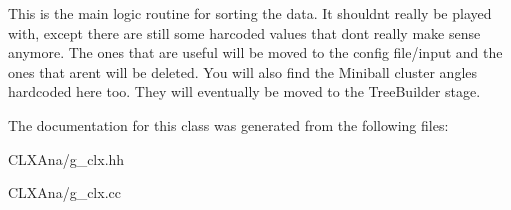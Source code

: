 This is the main logic routine for sorting the data. It shouldn\textquotesingle{}t really be played with, except there are still some harcoded values that don\textquotesingle{}t really make sense anymore. The ones that are useful will be moved to the config file/input and the ones that aren\textquotesingle{}t will be deleted. You will also find the Miniball cluster angles hardcoded here too. They will eventually be moved to the Tree\+Builder stage. 

The documentation for this class was generated from the following files\+:\begin{DoxyCompactItemize}
\item 
C\+L\+X\+Ana/g\+\_\+clx.\+hh\item 
C\+L\+X\+Ana/g\+\_\+clx.\+cc\end{DoxyCompactItemize}

